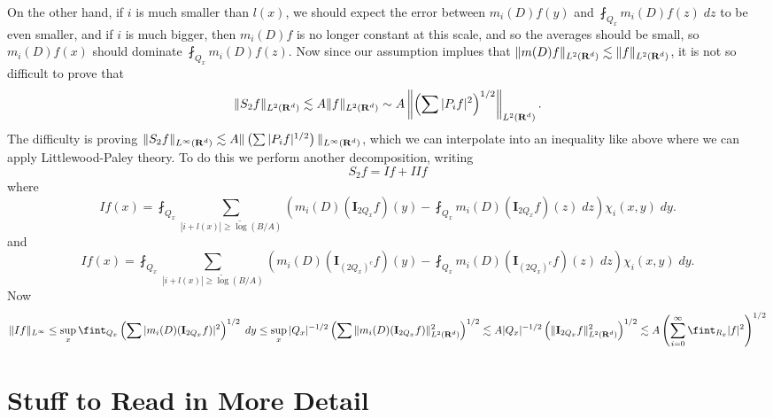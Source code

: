 On the other hand, if $i$ is much smaller than $l(x)$, we should expect the error between $m_i(D) f(y)$ and $\fint_{Q_x} m_i(D) f(z)\; dz$ to be even smaller, and if $i$ is much bigger, then $m_i(D) f$ is no longer constant at this scale, and so the averages should be small, so $m_i(D) f(x)$ should dominate $\fint_{Q_x} m_i(D) f(z)$. Now since our assumption implues that $\| m(D) f \|_{L^2(\operatorname{\mathbf{R}}^d)} \lesssim \| f \|_{L^2(\operatorname{\mathbf{R}}^d)}$, it is not so difficult to prove that
%
\[ \| S_2 f \|_{L^2(\operatorname{\mathbf{R}}^d)} \lesssim A \| f \|_{L^2(\operatorname{\mathbf{R}}^d)} \sim A \left\| \left( \sum |P_i f|^2 \right)^{1/2} \right\|_{L^2(\operatorname{\mathbf{R}}^d)}. \]
%
The difficulty is proving $\| S_2 f \|_{L^\infty(\operatorname{\mathbf{R}}^d)} \lesssim A \| \left( \sum |P_i f|^{1/2} \right) \|_{L^\infty(\operatorname{\mathbf{R}}^d)}$, which we can interpolate into an inequality like above where we can apply Littlewood-Paley theory. To do this we perform another decomposition, writing
%
\[ S_2 f = I f + {II}f \]
%
where
%
\[ If(x) = \fint_{Q_x} \sum_{|i + l(x)| \geq \tilde\log(B/A)} \left( m_i(D) (\mathbf{I}_{2Q_x}f)(y) - \fint_{Q_x} m_i(D)(\mathbf{I}_{2Q_x} f)(z)\; dz \right) \chi_i(x,y)\; dy. \]
%
and
%
\[ If(x) = \fint_{Q_x} \sum_{|i + l(x)| \geq \tilde\log(B/A)} \left( m_i(D) (\mathbf{I}_{(2Q_x)^c}f)(y) - \fint_{Q_x} m_i(D)(\mathbf{I}_{(2Q_x)^c} f)(z)\; dz \right) \chi_i(x,y)\; dy. \]
%
Now
%
\[ \|If \|_{L^\infty} \leq \sup_x \fint_{Q_x} \left( \sum | m_i(D) (\mathbf{I}_{2Q_x} f) |^2 \right)^{1/2}\; dy \leq \sup_x |Q_x|^{-1/2} \left( \sum \| m_i(D) (\mathbf{I}_{2Q_x} f) \|_{L^2(\RR^d)}^2 \right)^{1/2} \lesssim A |Q_x|^{-1/2} \left( \| \mathbf{I}_{2Q_x} f \|_{L^2(\RR^d)}^2 \right)^{1/2} \lesssim A \left( \sum_{i = 0}^\infty \fint_{R_x} |f|^2 \right)^{1/2} \]




\part{Stuff to Read in More Detail}

